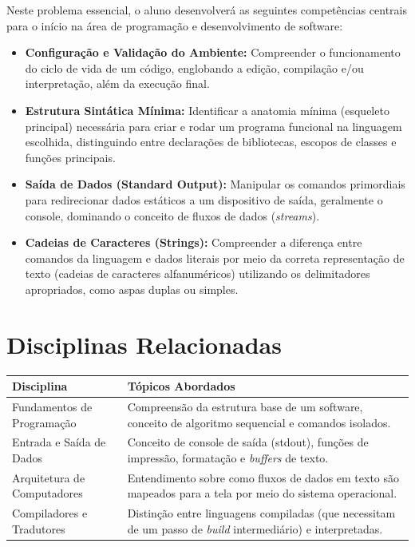\documentclass{article}
\begin{document}

\begin{objetivobox}
Neste problema essencial, o aluno desenvolverá as seguintes competências centrais para o início na área de programação e desenvolvimento de software:
\begin{itemize}
    \item \textbf{Configuração e Validação do Ambiente:} Compreender o funcionamento do ciclo de vida de um código, englobando a edição, compilação e/ou interpretação, além da execução final.
    \item \textbf{Estrutura Sintática Mínima:} Identificar a anatomia mínima (esqueleto principal) necessária para criar e rodar um programa funcional na linguagem escolhida, distinguindo entre declarações de bibliotecas, escopos de classes e funções principais.
    \item \textbf{Saída de Dados (Standard Output):} Manipular os comandos primordiais para redirecionar dados estáticos a um dispositivo de saída, geralmente o console, dominando o conceito de fluxos de dados (\textit{streams}).
    \item \textbf{Cadeias de Caracteres (Strings):} Compreender a diferença entre comandos da linguagem e dados literais por meio da correta representação de texto (cadeias de caracteres alfanuméricos) utilizando os delimitadores apropriados, como aspas duplas ou simples.
\end{itemize}
\end{objetivobox}

\section*{Disciplinas Relacionadas}

\begin{table}[h]
\centering
\begin{tabularx}{\textwidth}{l X}
\toprule
\textbf{Disciplina} & \textbf{Tópicos Abordados} \\
\midrule
Fundamentos de Programação & Compreensão da estrutura base de um software, conceito de algoritmo sequencial e comandos isolados. \\
Entrada e Saída de Dados   & Conceito de console de saída (stdout), funções de impressão, formatação e \textit{buffers} de texto. \\
Arquitetura de Computadores & Entendimento sobre como fluxos de dados em texto são mapeados para a tela por meio do sistema operacional. \\
Compiladores e Tradutores   & Distinção entre linguagens compiladas (que necessitam de um passo de \textit{build} intermediário) e interpretadas. \\
\bottomrule
\end{tabularx}
\end{table}
\end{document}
